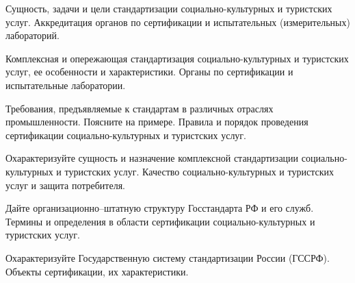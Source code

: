 \documentclass[
	14pt,
	a4paper,
	]
	{scrartcl}
\begin{document}
\shapk
{}
\setcounter{zad}{0}

\vfill
\z Сущность, задачи и цели стандартизации социально-культурных и туристских услуг.
 \vfill
\z Аккредитация органов по сертификации и испытательных (измерительных) лабораторий. \vfill

\vfill

\newpage


\shapk
{}
\setcounter{zad}{0}

\vfill
\z Комплексная и опережающая стандартизация социально-культурных и туристских услуг, ее особенности и характеристики.
 \vfill
\z Органы по сертификации и испытательные лаборатории. 
 \vfill

\vfill

\newpage


\shapk
{}
\setcounter{zad}{0}

\vfill
\z Требования, предъявляемые к стандартам в различных отраслях промышленности. Поясните на примере.
 \vfill
\z Правила и порядок проведения сертификации социально-культурных и туристских услуг.
 \vfill

\vfill

\newpage


\shapk
{}
\setcounter{zad}{0}

\vfill
\z Охарактеризуйте сущность и назначение комплексной стандартизации социально-культурных и туристских услуг.
 \vfill
\z Качество социально-культурных и туристских услуг и защита потребителя.
 \vfill

\vfill

\newpage


\shapk
{}
\setcounter{zad}{0}

\vfill
\z Дайте организационно–штатную структуру Госстандарта РФ и его служб.
 \vfill
\z Термины и определения в области сертификации социально-культурных и туристских услуг.
 \vfill

\vfill

\newpage


\shapk
{}
\setcounter{zad}{0}

\vfill
\z Охарактеризуйте Государственную систему стандартизации России (ГССРФ). 
 \vfill
\z Объекты сертификации, их характеристики.
 \vfill

\vfill

\newpage


\shapk
{}
\setcounter{zad}{0}
\end{document}

